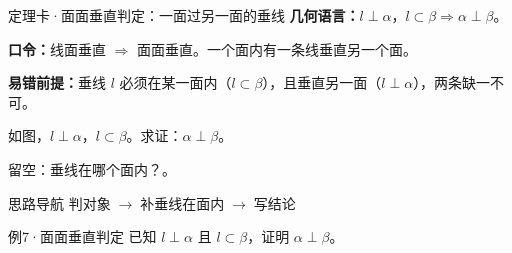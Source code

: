 \documentclass{exam-zh}
\begin{document}
\begin{eduDualExplain}
  \begin{eduExplainLeft}
  \end{eduExplainLeft}

  \begin{eduExplainRight}
  \end{eduExplainRight}
\end{eduDualExplain}





\begin{eduSolutionBox}{定理卡·面面垂直判定：一面过另一面的垂线}
  \begingroup
  \setlength{\parskip}{2.5mm}
\textbf{几何语言：}$l\perp\alpha$，$l\subset\beta\Rightarrow\alpha\perp\beta$。\par
\textbf{口令：}线面垂直 $\Rightarrow$ 面面垂直。一个面内有一条线垂直另一个面。\par
\textbf{易错前提：}垂线 $l$ 必须在某一面内（$l\subset\beta$），且垂直另一面（$l\perp\alpha$），两条缺一不可。\par
  \endgroup
\end{eduSolutionBox}




\begin{eduProblemBlock}[例7·面面垂直判定]
如图，$l\perp\alpha$，$l\subset\beta$。求证：$\alpha\perp\beta$。
\par\noindent 留空：垂线在哪个面内？\underline{\hspace{20mm}}。

\end{eduProblemBlock}





\begin{eduAuxItem}{思路导航}
判对象$\;\to\;$补垂线在面内$\;\to\;$写结论\end{eduAuxItem}




\begin{eduSubQuestionItem}{例7·面面垂直判定}
已知 $l\perp\alpha$ 且 $l\subset\beta$，证明 $\alpha\perp\beta$。\end{eduSubQuestionItem}
\end{document}
